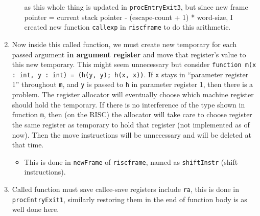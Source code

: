 \begin{enumerate}
\begin{enumerate}
		            as this whole thing is updated in
		            \texttt{procEntryExit3},
		            but since new frame pointer = current stack pointer - (escape-count
		            + 1) * word-size, I created new function
		            \texttt{callexp}
		            in
		            \texttt{riscframe}
		            to do this arithmetic.
	      \end{enumerate}
	\item
	      Now inside this called function, we must create new temporary for each
	      passed argument \textbf{in argument register} and move that register's
	      value to this new temporary. This might seem unnecessary but consider
	      \texttt{function m(x : int, y : int) = (h(y, y); h(x, x))}.
	      If \texttt{x}
	      stays in ``parameter register 1'' throughout
	      \texttt{m},
	      and \texttt{y}
	      is passed to
	      \texttt{h} in
	      parameter register 1, then there is a problem. The register allocator
	      will eventually choose which machine register should hold the
	      temporary. If there is no interference of the type shown in function
	      \texttt{m},
	      then (on the RISC) the allocator will take care to choose register the
	      same register as temporary to hold that register (not implemented as of now). Then the move
	      instructions will be unnecessary and will be deleted at that time.

	      \begin{itemize}
		      \item
		            This is done in
		            \texttt{newFrame}
		            of
		            \texttt{riscframe},
		            named as
		            \texttt{shiftInstr}
		            (shift instructions).
	      \end{itemize}
	\item
	      Called function must save callee-save registers include
	      \texttt{ra},
	      this is done in
	      \texttt{procEntryExit1},
	      similarly restoring them in the end of function body is as well done
	      here.
\end{enumerate}

